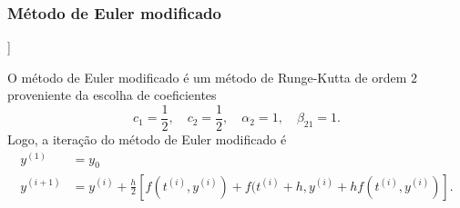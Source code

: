 \subsubsection{Método de Euler modificado}

\begin{flushleft}
  [[tag:revisar]]
\end{flushleft}

O método de Euler modificado é um método de Runge-Kutta de ordem $2$ proveniente da escolha de coeficientes
\begin{equation}
  c_1 = \frac{1}{2}, \quad c_2 = \frac{1}{2}, \quad \alpha_2 = 1,\quad \beta_{21}=1.
\end{equation}
Logo, a iteração do método de Euler modificado é
\begin{align}
  y^{(1)} &= y_0\\
  y^{(i+1)} &= y^{(i)} + \frac{h}{2}\left[f(t^{(i)},y^{(i)}) + f(t^{(i)}+h,y^{(i)}+hf(t^{(i)},y^{(i)})\right].
\end{align}

